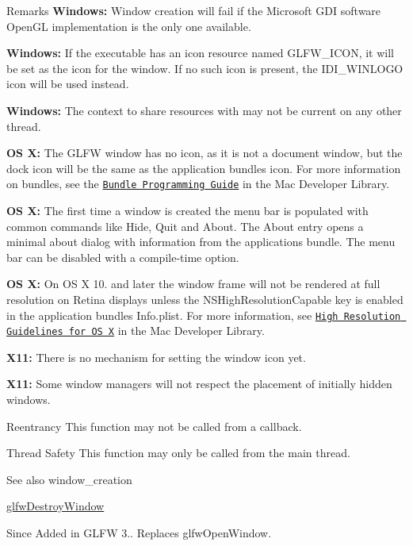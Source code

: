 \begin{DoxyRemark}{Remarks}
{\bfseries Windows\+:} Window creation will fail if the Microsoft G\+D\+I software Open\+G\+L implementation is the only one available.

{\bfseries Windows\+:} If the executable has an icon resource named {\ttfamily G\+L\+F\+W\+\_\+\+I\+C\+O\+N,} it will be set as the icon for the window. If no such icon is present, the {\ttfamily I\+D\+I\+\_\+\+W\+I\+N\+L\+O\+G\+O} icon will be used instead.

{\bfseries Windows\+:} The context to share resources with may not be current on any other thread.

{\bfseries O\+S X\+:} The G\+L\+F\+W window has no icon, as it is not a document window, but the dock icon will be the same as the application bundle\textquotesingle{}s icon. For more information on bundles, see the \href{https://developer.apple.com/library/mac/documentation/CoreFoundation/Conceptual/CFBundles/}{\tt Bundle Programming Guide} in the Mac Developer Library.

{\bfseries O\+S X\+:} The first time a window is created the menu bar is populated with common commands like Hide, Quit and About. The About entry opens a minimal about dialog with information from the application\textquotesingle{}s bundle. The menu bar can be disabled with a compile-\/time option.

{\bfseries O\+S X\+:} On O\+S X 10. and later the window frame will not be rendered at full resolution on Retina displays unless the {\ttfamily N\+S\+High\+Resolution\+Capable} key is enabled in the application bundle\textquotesingle{}s {\ttfamily Info.\+plist}. For more information, see \href{https://developer.apple.com/library/mac/documentation/GraphicsAnimation/Conceptual/HighResolutionOSX/Explained/Explained.html}{\tt High Resolution Guidelines for O\+S X} in the Mac Developer Library.

{\bfseries X11\+:} There is no mechanism for setting the window icon yet.

{\bfseries X11\+:} Some window managers will not respect the placement of initially hidden windows.
\end{DoxyRemark}
\begin{DoxyParagraph}{Reentrancy}
This function may not be called from a callback.
\end{DoxyParagraph}
\begin{DoxyParagraph}{Thread Safety}
This function may only be called from the main thread.
\end{DoxyParagraph}
\begin{DoxySeeAlso}{See also}
window\+\_\+creation 

\hyperlink{group__window_ga806747476b7247d292be3711c323ea10}{glfw\+Destroy\+Window}
\end{DoxySeeAlso}
\begin{DoxySince}{Since}
Added in G\+L\+F\+W 3.. Replaces {\ttfamily glfw\+Open\+Window}. 
\end{DoxySince}
\hypertarget{group__window_ga8050ddceed9dc6bd9d3aa35666195cd4}{}
